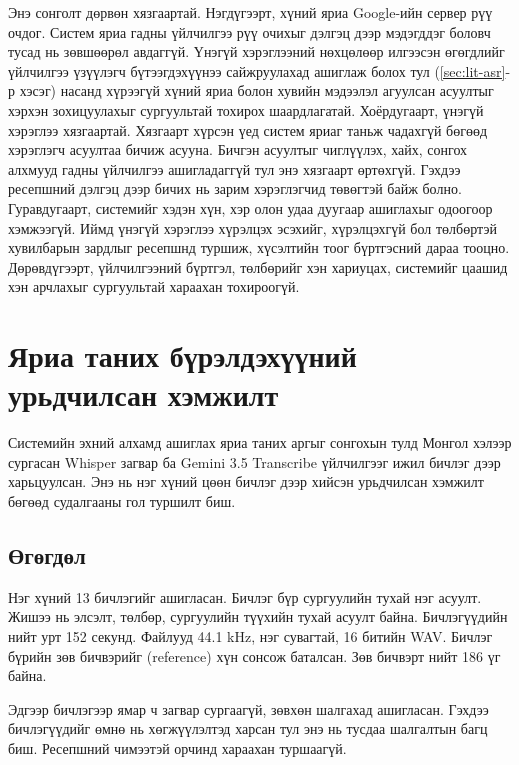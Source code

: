 Энэ сонголт дөрвөн хязгаартай. Нэгдүгээрт, хүний яриа Google-ийн сервер рүү очдог. Систем яриа гадны үйлчилгээ рүү очихыг дэлгэц дээр мэдэгддэг боловч тусад нь зөвшөөрөл авдаггүй. Үнэгүй хэрэглээний нөхцөлөөр илгээсэн өгөгдлийг үйлчилгээ үзүүлэгч бүтээгдэхүүнээ сайжруулахад ашиглаж болох тул (\ref{sec:lit-asr}-р хэсэг) насанд хүрээгүй хүний яриа болон хувийн мэдээлэл агуулсан асуултыг хэрхэн зохицуулахыг сургуультай тохирох шаардлагатай. Хоёрдугаарт, үнэгүй хэрэглээ хязгаартай. Хязгаарт хүрсэн үед систем яриаг таньж чадахгүй бөгөөд хэрэглэгч асуултаа бичиж асууна. Бичгэн асуултыг чиглүүлэх, хайх, сонгох алхмууд гадны үйлчилгээ ашигладаггүй тул энэ хязгаарт өртөхгүй. Гэхдээ ресепшний дэлгэц дээр бичих нь зарим хэрэглэгчид төвөгтэй байж болно. Гуравдугаарт, системийг хэдэн хүн, хэр олон удаа дуугаар ашиглахыг одоогоор хэмжээгүй. Иймд үнэгүй хэрэглээ хүрэлцэх эсэхийг, хүрэлцэхгүй бол төлбөртэй хувилбарын зардлыг ресепшнд туршиж, хүсэлтийн тоог бүртгэсний дараа тооцно. Дөрөвдүгээрт, үйлчилгээний бүртгэл, төлбөрийг хэн хариуцах, системийг цаашид хэн арчлахыг сургуультай хараахан тохироогүй.

\iffalse
\section{Яриа таних бүрэлдэхүүний урьдчилсан хэмжилт}
\label{sec:exp-stt}

Системийн эхний алхамд ашиглах яриа таних аргыг сонгохын тулд Монгол хэлээр сургасан Whisper загвар ба Gemini 3.5 Transcribe үйлчилгээг ижил бичлэг дээр харьцуулсан. Энэ нь нэг хүний цөөн бичлэг дээр хийсэн урьдчилсан хэмжилт бөгөөд судалгааны гол туршилт биш.

\subsection{Өгөгдөл}
\label{sec:stt-data}

Нэг хүний 13 бичлэгийг ашигласан. Бичлэг бүр сургуулийн тухай нэг асуулт. Жишээ нь элсэлт, төлбөр, сургуулийн түүхийн тухай асуулт байна. Бичлэгүүдийн нийт урт 152 секунд. Файлууд 44.1 kHz, нэг сувагтай, 16 битийн WAV. Бичлэг бүрийн зөв бичвэрийг (reference) хүн сонсож баталсан. Зөв бичвэрт нийт 186 үг байна.

Эдгээр бичлэгээр ямар ч загвар сургаагүй, зөвхөн шалгахад ашигласан. Гэхдээ бичлэгүүдийг өмнө нь хөгжүүлэлтэд харсан тул энэ нь тусдаа шалгалтын багц биш. Ресепшний чимээтэй орчинд хараахан туршаагүй.

